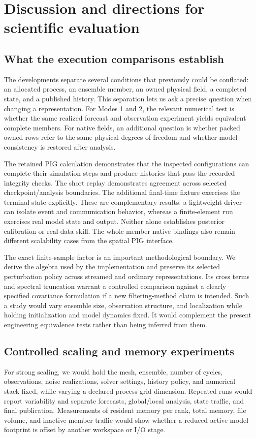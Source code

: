 \documentclass[11pt,a4paper]{article}
\begin{document}
\section{Discussion and directions for scientific evaluation}\label{sec:future}
\subsection{What the execution comparisons establish}
The developments separate several conditions that previously could be conflated: an allocated process, an ensemble member, an owned physical field, a completed state, and a published history. This separation lets us ask a precise question when changing a representation. For Modes 1 and 2, the relevant numerical test is whether the same realized forecast and observation experiment yields equivalent complete members. For native fields, an additional question is whether packed owned rows refer to the same physical degrees of freedom and whether model consistency is restored after analysis.

The retained PIG calculation demonstrates that the inspected configurations can complete their simulation steps and produce histories that pass the recorded integrity checks. The short replay demonstrates agreement across selected checkpoint/analysis boundaries. The additional final-time fixture exercises the terminal state explicitly. These are complementary results: a lightweight driver can isolate event and communication behavior, whereas a finite-element run exercises real model state and output. Neither alone establishes posterior calibration or real-data skill. The whole-member native bindings also remain different scalability cases from the spatial PIG interface.

The exact finite-sample factor is an important methodological boundary. We derive the algebra used by the implementation and preserve its selected perturbation policy across streamed and ordinary representations. Its cross terms and spectral truncation warrant a controlled comparison against a clearly specified covariance formulation if a new filtering-method claim is intended. Such a study would vary ensemble size, observation structure, and localization while holding initialization and model dynamics fixed. It would complement the present engineering equivalence tests rather than being inferred from them.

\subsection{Controlled scaling and memory experiments}
For strong scaling, we would hold the mesh, ensemble, number of cycles, observations, noise realizations, solver settings, history policy, and numerical stack fixed, while varying a declared process-grid dimension. Repeated runs would report variability and separate forecasts, global/local analysis, state traffic, and final publication. Measurements of resident memory per rank, total memory, file volume, and inactive-member traffic would show whether a reduced active-model footprint is offset by another workspace or I/O stage.
\end{document}
